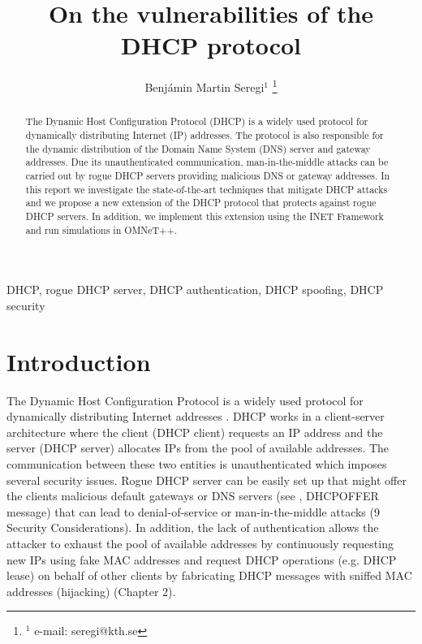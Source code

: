 \documentclass[letterpaper, 10 pt, conference]{ieeeconf}  %
\title{\LARGE \bf
On the vulnerabilities of the DHCP protocol
}
\author{Benjámin Martin Seregi$^{1}$%
\thanks{$^{1}$ e-mail: seregi@kth.se}%
}
\begin{document}
\maketitle
\thispagestyle{firstpage}
\pagestyle{plain}
\cfoot{\thepage}

\begin{abstract}
The Dynamic Host Configuration Protocol (DHCP) is a widely used protocol for dynamically distributing Internet (IP) addresses. The protocol is also responsible for the dynamic distribution of the Domain Name System (DNS) server and gateway addresses. Due its unauthenticated communication, man-in-the-middle attacks can be carried out by rogue DHCP servers providing malicious DNS or gateway addresses. In this report we investigate the state-of-the-art techniques that mitigate DHCP attacks and we propose a new extension of the DHCP protocol that protects against rogue DHCP servers. In addition, we implement this extension using the INET Framework and run simulations in OMNeT++.
\end{abstract}

\begin{keywords}
DHCP, rogue DHCP server, DHCP authentication, DHCP spoofing, DHCP security
\end{keywords}

\section{Introduction}
The Dynamic Host Configuration Protocol is a widely used protocol for dynamically distributing Internet addresses \cite{dhcprfc}. DHCP works in a client-server architecture where the client (DHCP client) requests an IP address and the server (DHCP server) allocates IPs from the pool of available addresses. The communication between these two entities is unauthenticated \cite{dhcprfc} which imposes several security issues. Rogue DHCP server can be easily set up that might offer the clients malicious default gateways or DNS servers (see \cite{dhcprfc}, DHCPOFFER message) that can lead to denial-of-service or man-in-the-middle attacks \cite{Rooney:2010:IIA:1951974} (9 Security Considerations). In addition, the lack of authentication allows the attacker to exhaust the pool of available addresses by continuously requesting new IPs using fake MAC addresses and request DHCP operations (e.g. DHCP lease) on behalf of other clients by fabricating DHCP messages with sniffed MAC addresses (hijacking) \cite{practical-embedded-security} (Chapter 2).
\end{document}
